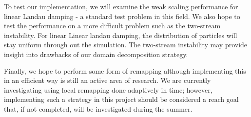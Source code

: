 \documentclass[aps,12pt, notitlepage]{revtex4-1}
\renewcommand{\=}[1]{\overline{#1}}
\begin{document}
To test our implementation, we will examine the weak scaling performance for linear Landau damping - a standard test problem in this field. 
We also hope to test the performance on a more difficult problem such as the two-stream instability. 
For linear Linear landau damping, the distribution of particles will stay uniform through out the simulation. 
The two-stream instability may provide insight into drawbacks of our domain decomposition strategy. 

Finally, we hope to perform some form of remapping although implementing this in an efficient way is still an active area of research. 
We are currently investigating using local remapping done adaptively in time; however, implementing such a strategy in this project should be considered a reach goal that, if not completed, will be investigated during the summer. 



\renewcommand{\refname}{\normalsize\textbf References}
{}
\end{document}
